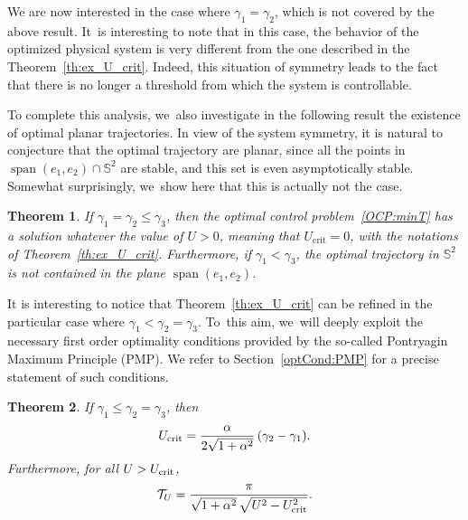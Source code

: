 \documentclass[JEP,XML,SOM,Unicode,NoEqCountersInSection,NoFloatCountersInSection,published]{cedram}
\newtheorem{theorem}{Theorem}
\theoremstyle{definition}
\begin{document}
We are now interested in the case where $\gamma_1=\gamma_2$, which is not covered by the above result. It~is interesting to note that in this case, the behavior of the optimized physical system is very different from the one described in the Theorem~\ref{th:ex_U_crit}. Indeed, this situation of symmetry leads to the fact that there is no longer a threshold from which the system is controllable.

To complete this analysis, we~also investigate in the following result the existence of optimal planar trajectories. In view of the system symmetry, it is natural to conjecture that the optimal trajectory are planar, since all the points in $\operatorname{span} (e_1, e_2) \cap \mathbb{S}^2$ are stable, and this set is even asymptotically stable. Somewhat surprisingly, we~show here that this is actually not the case.

\begin{theorem}\label{theo:gamma1=gamma2}
If $\gamma_1=\gamma_2\leq \gamma_3$, then the optimal control problem~\eqref{OCP:minT} has a solution whatever the value of $U >0$, meaning that $U_{\textrm{crit}}=0$, with the notations of Theorem~\ref{th:ex_U_crit}. Furthermore, if $\gamma_1<\gamma_3$, the optimal trajectory in $\mathbb{S}^2$ is not contained in the plane $\operatorname{span}(e_1,e_2)$.
\end{theorem}

It is interesting to notice that Theorem~\ref{th:ex_U_crit} can be refined in the particular case where $\gamma_1 < \gamma_2 = \gamma_3$. To~this aim, we~will deeply exploit the necessary first order optimality conditions provided by the so-called Pontryagin Maximum Principle (PMP). We refer to Section~\ref{optCond:PMP} for a precise statement of such conditions.

\begin{theorem}\label{theo:gamma2=gamma3}
If $\gamma_1\leq \gamma_2 = \gamma_3$, then
\[
U_\textnormal{crit} = \frac{\alpha}{2 \sqrt{1 + \alpha^2}}\, (\gamma_2 - \gamma_1).
\]
Furthermore, for all $U > U_\textnormal{crit}$,
\[
\mathcal{T}_U = \frac{\pi}{\sqrt{1 + \alpha^2}\, \sqrt{U^2 - U_\textnormal{crit}^2}}.
\]
\end{theorem}
\end{document}
